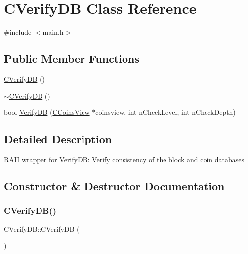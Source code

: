 \hypertarget{class_c_verify_d_b}{}\section{C\+Verify\+DB Class Reference}
\label{class_c_verify_d_b}


{\ttfamily \#include $<$main.\+h$>$}

\subsection*{Public Member Functions}
\begin{DoxyCompactItemize}
\item 
\mbox{\hyperlink{class_c_verify_d_b_ab33a26982ba391fc71614f8eee9dbaa0}{C\+Verify\+DB}} ()
\item 
\mbox{\hyperlink{class_c_verify_d_b_a4a04d4554f763b8803082fae81513f40}{$\sim$\+C\+Verify\+DB}} ()
\item 
bool \mbox{\hyperlink{class_c_verify_d_b_a5d3e3ade35a14ddce2404e18e4b1df50}{Verify\+DB}} (\mbox{\hyperlink{class_c_coins_view}{C\+Coins\+View}} $\ast$coinsview, int n\+Check\+Level, int n\+Check\+Depth)
\end{DoxyCompactItemize}


\subsection{Detailed Description}
R\+A\+II wrapper for Verify\+DB\+: Verify consistency of the block and coin databases 

\subsection{Constructor \& Destructor Documentation}
\mbox{\label{class_c_verify_d_b_ab33a26982ba391fc71614f8eee9dbaa0}} 
\subsubsection{\texorpdfstring{C\+Verify\+D\+B()}{CVerifyDB()}}
{\footnotesize\ttfamily C\+Verify\+D\+B\+::\+C\+Verify\+DB (\begin{DoxyParamCaption}{ }\end{DoxyParamCaption})}

\mbox{\label{class_c_verify_d_b_a4a04d4554f763b8803082fae81513f40}} 
